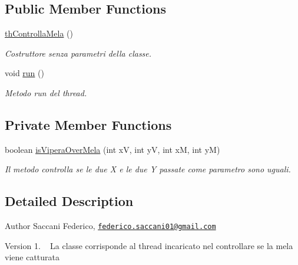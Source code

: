 \subsection*{Public Member Functions}
\begin{DoxyCompactItemize}
\item 
\mbox{\hyperlink{class_snake_1_1game_1_1threads_1_1th_controlla_mela_a7d39d84a4c54b7e371e5230fb693b020}{th\+Controlla\+Mela}} ()
\begin{DoxyCompactList}\small\item\em Costruttore senza parametri della classe. \end{DoxyCompactList}\item 
void \mbox{\hyperlink{class_snake_1_1game_1_1threads_1_1th_controlla_mela_a13a43e6d814de94978c515cb084873b1}{run}} ()
\begin{DoxyCompactList}\small\item\em Metodo run del thread. \end{DoxyCompactList}\end{DoxyCompactItemize}
\subsection*{Private Member Functions}
\begin{DoxyCompactItemize}
\item 
boolean \mbox{\hyperlink{class_snake_1_1game_1_1threads_1_1th_controlla_mela_a8b1e3878460295cc10e070af8d1f1297}{is\+Vipera\+Over\+Mela}} (int xV, int yV, int xM, int yM)
\begin{DoxyCompactList}\small\item\em Il metodo controlla se le due X e le due Y passate come parametro sono uguali. \end{DoxyCompactList}\end{DoxyCompactItemize}


\subsection{Detailed Description}
\begin{DoxyAuthor}{Author}
Saccani Federico, \href{mailto:federico.saccani01@gmail.com}{\tt federico.\+saccani01@gmail.\+com} 
\end{DoxyAuthor}
\begin{DoxyVersion}{Version}
1. ~\newline
La classe corrisponde al thread incaricato nel controllare se la mela viene catturata 
\end{DoxyVersion}


